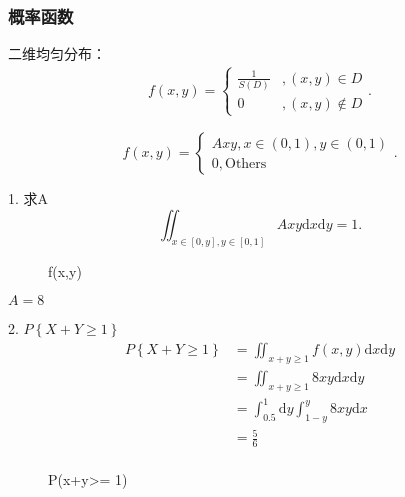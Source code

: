 \subsubsection*{概率函数}%
\label{subsub:概率函数}
\begin{notation}
    二维均匀分布：
    \begin{align*}
        f\left( x,y \right) =\begin{cases}
            \displaystyle{\frac{1}{S\left( D \right) }}&,\left( x,y \right) \in D\\
            0 & , \left( x,y \right) \not\in D
        \end{cases}
    .\end{align*}
\end{notation}
\begin{eg}
    \[
        f\left( x,y \right) =\begin{cases}
            Axy,x\in \left( 0,1 \right) ,y\in \left( 0,1 \right) \\
            0,\text{Others}
        \end{cases}
    .\] 
    
    1. 求A
    \[
        \iint_{x\in [0,y] ,y\in [0,1] } Axy \mathrm{d}x\mathrm{d}y=1
    .\] 
    \begin{figure}[htbp]
        \centering
        \caption{f(x,y)}
        \label{f( x,y )}
    \end{figure}
    $A=8$

    2. $P\left\{ X+Y\ge 1 \right\} $ 
    \begin{align*}
        P\left\{ X+Y\ge 1 \right\} &=\iint_{x+y\ge 1} f\left( x,y \right)  \mathrm{d}x\mathrm{d}y \\
        &= \iint_{x+y\ge 1} 8xy \mathrm{d}x\mathrm{d}y \\
        &= \int_{0.5}^{1} \mathrm{d}y \int_{1-y}^{y} 8xy \mathrm{d}x \\
        &= \frac{5}{6} \\
    \end{align*}
    \begin{figure}[htbp]
        \centering
        \caption{P(x+y>= 1)}
        \label{P(x+y>= 1)}
    \end{figure}


\end{eg}
